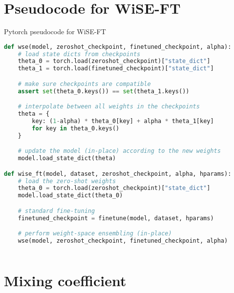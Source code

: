\clearpage


\appendix


\section{Pseudocode for WiSE-FT}
\label{sec:pseudo-code}

\begin{algorithm}[H]
\caption{Pytorch pseudocode for WiSE-FT}
\label{alg:code}
\begin{lstlisting}[language=python]
def wse(model, zeroshot_checkpoint, finetuned_checkpoint, alpha):
    # load state dicts from checkpoints
    theta_0 = torch.load(zeroshot_checkpoint)["state_dict"]
    theta_1 = torch.load(finetuned_checkpoint)["state_dict"]

    # make sure checkpoints are compatible
    assert set(theta_0.keys()) == set(theta_1.keys())

    # interpolate between all weights in the checkpoints
    theta = {
        key: (1-alpha) * theta_0[key] + alpha * theta_1[key]
        for key in theta_0.keys()
    }

    # update the model (in-place) according to the new weights
    model.load_state_dict(theta)

def wise_ft(model, dataset, zeroshot_checkpoint, alpha, hparams):
    # load the zero-shot weights
    theta_0 = torch.load(zeroshot_checkpoint)["state_dict"]
    model.load_state_dict(theta_0)

    # standard fine-tuning
    finetuned_checkpoint = finetune(model, dataset, hparams)

    # perform weight-space ensembling (in-place)
    wse(model, zeroshot_checkpoint, finetuned_checkpoint, alpha)
        
\end{lstlisting}
\end{algorithm}


\section{Mixing coefficient}
\label{sec:appendix_alpha}

